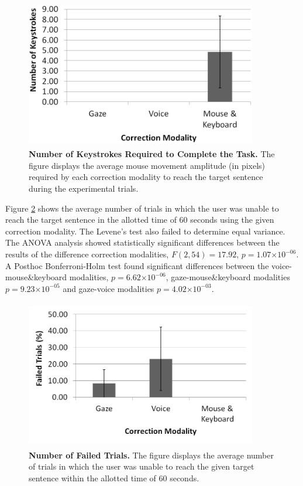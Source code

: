 \documentclass[]{article}
\providecommand{\e}[1]{\ensuremath{\times 10^{#1}}}
\begin{document}
\begin{figure}[ht]
\begin{center}
\vspace{-3mm}
\includegraphics[width=0.9\textwidth,height=65mm]{figures/keystrokes.png}
\end{center}
\caption{\textbf{Number of Keystrokes Required to Complete the Task.} The figure displays the average mouse movement amplitude (in pixels)
required by each correction modality to reach the target sentence during the experimental trials.}
\label{keystrokes}
\end{figure}


Figure \ref{failFig} shows the average number of trials in which the user was unable to reach the target sentence in the
allotted time of 60 seconds using the given correction modality. The Levene's test also failed to determine equal
variance. The ANOVA analysis showed statistically significant differences between the results of the
difference correction modalities, $F(2,54)=17.92$, $p=1.07\e{-06}$.   A Posthoc Bonferroni-Holm test found
significant differences between the voice-mouse\&keyboard modalities, $p=6.62\e{-06}$, gaze-mouse\&keyboard modalities
$p=9.23\e{-05}$ and gaze-voice modalities $p=4.02\e{-03}$.


\begin{figure}[ht]
\begin{center}
\vspace{-3mm}
\includegraphics[width=0.9\textwidth,height=65mm]{figures/fail.png}
\end{center}
\caption{\textbf{Number of Failed Trials.} The figure displays the average number of trials in which the user
was unable to reach the given target sentence within the allotted time of 60 seconds.}
\label{failFig}
\end{figure}
\end{document}
